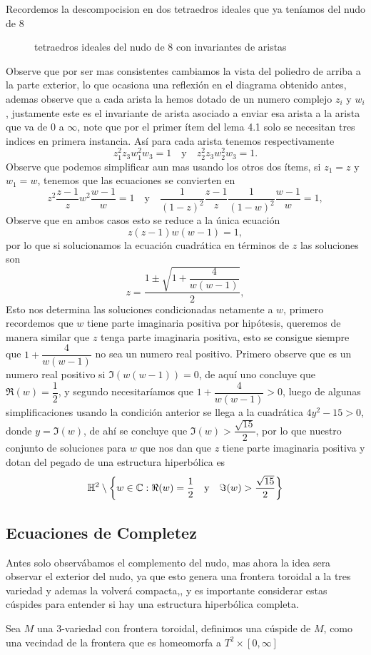 \begin{eg}
    Recordemos la descompocision en dos tetraedros ideales que ya teníamos del nudo de $8$
    \begin{figure}[H]
    \centering
    
        \caption{tetraedros ideales del nudo de 8 con invariantes de aristas}
    \end{figure}
    Observe que por ser mas consistentes cambiamos la vista del poliedro de arriba a la parte exterior, lo que ocasiona una reflexión en el diagrama obtenido antes, ademas observe que a cada arista la hemos dotado de un numero complejo $z_i$ y $w_i$, justamente este es el invariante de arista asociado a enviar esa arista a la arista que va de $0$ a $\infty$, note que por el primer ítem del lema 4.1 solo se necesitan tres indices en primera instancia. Así para cada arista tenemos respectivamente
    $$z_1^2z_3w_1^2w_3=1\quad\text{y}\quad z_2^2z_3w_2^2w_3=1.$$
    Observe que podemos simplificar aun mas usando los otros dos ítems, si $z_1=z$ y $w_1=w$, tenemos que las ecuaciones se convierten en
    $$z^2\frac{z-1}{z}w^2\frac{w-1}{w}=1\quad\text{y}\quad \frac{1}{(1-z)^2}\frac{z-1}{z}\frac{1}{(1-w)^2}\frac{w-1}{w}=1,$$
    Observe que en ambos casos esto se reduce a la única ecuación
    $$z(z-1)w(w-1)=1,$$
    por lo que si solucionamos la ecuación cuadrática en términos de $z$ las soluciones son
    $$z=\frac{1\pm\sqrt{1+\dfrac{4}{w(w-1)}}}{2},$$
    Esto nos determina las soluciones condicionadas netamente a $w$, primero recordemos que $w$ tiene parte imaginaria positiva por hipótesis, queremos de manera similar que $z$ tenga parte imaginaria positiva, esto se consigue siempre que $1+\dfrac{4}{w(w-1)}$ no sea un numero real positivo. Primero observe que es un numero real positivo si $\Im(w(w-1))= 0$, de aquí uno concluye que $\Re(w)=\dfrac{1}{2}$, y segundo necesitaríamos que $1+\dfrac{4}{w(w-1)}>0$, luego de algunas simplificaciones usando la condición anterior se llega a la cuadrática $4y^2-15>0$, donde $y=\Im(w)$, de ahí se concluye que $\Im(w)>\dfrac{\sqrt{15}}{2}$, por lo que nuestro conjunto de soluciones para $w$ que nos dan que $z$ tiene parte imaginaria positiva y dotan del pegado de una estructura hiperbólica es
    $$\mathbb{H}^2\setminus\left\{w\in\mathbb{C}:\Re(w)=\frac{1}{2}\quad\text{y}\quad \Im(w)>\frac{\sqrt{15}}{2}\right\}$$ 
\end{eg}

\subsection{Ecuaciones de Completez}
Antes solo observábamos el complemento del nudo, mas ahora la idea sera observar el exterior del nudo, ya que esto genera una frontera toroidal a la tres variedad y ademas la volverá compacta,, y es importante considerar estas cúspides para entender si hay una estructura hiperbólica completa.
\begin{definition}
    Sea $M$ una 3-variedad con frontera toroidal, definimos una cúspide de $M$, como una vecindad de la frontera que es homeomorfa a $T^2\times [0,\infty]$
\end{definition}

